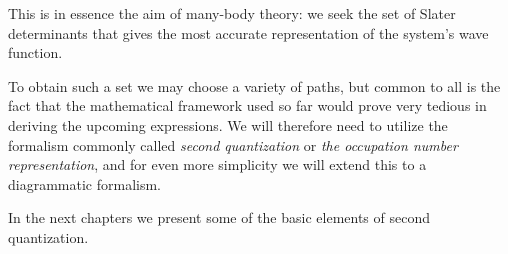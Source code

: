 This is in essence the aim of many-body theory: we seek the
set of Slater determinants that gives the most accurate representation of the system's
wave function.

To obtain such a set we may choose a variety of paths, but common to
all is the fact that the mathematical framework used so far would
prove very tedious in deriving the upcoming expressions. We will
therefore need to utilize the formalism commonly called 
\emph{second quantization} or 
\emph{the occupation number representation}, and for
even more simplicity we will extend this to a diagrammatic formalism.

In the next chapters we present some of the basic elements of second quantization.









